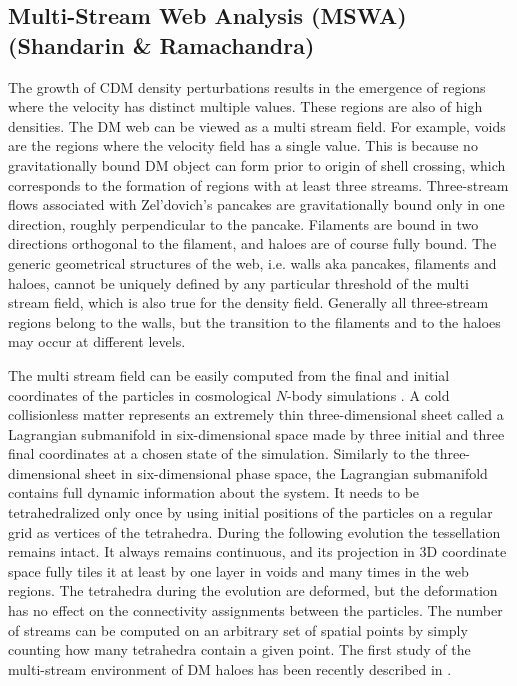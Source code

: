 \subsection{Multi-Stream Web Analysis (MSWA)\\ \hskip 0.85cm (Shandarin \& Ramachandra)}
\label{section:shandarin}

The growth of CDM density perturbations results in the emergence of regions where the velocity has distinct multiple values.
These regions are also of high densities. The DM web can be viewed as a multi stream field. For example, voids are the regions 
where the velocity field has a single value. This is because no gravitationally bound DM object can form prior to origin of shell crossing, which 
corresponds to the formation of regions with at least three streams. Three-stream flows associated with Zel'dovich's pancakes are
gravitationally bound only in one direction, roughly perpendicular to the pancake. Filaments are bound in two directions orthogonal to the
filament, and haloes are of course fully bound.
The generic geometrical structures of the web, i.e. walls aka pancakes, filaments and haloes, 
cannot be uniquely defined by any particular threshold of the multi stream field, which is also true for the density field.
Generally all three-stream regions belong to the walls, but the transition to the filaments and to the haloes may occur at different levels.

The multi stream field can be easily computed from the final and initial coordinates of the particles in cosmological $N$-body simulations
\citep{ abel2012,shandarin2012}. 
A cold collisionless matter represents an extremely thin three-dimensional sheet called a Lagrangian submanifold in six-dimensional space 
made by  three  initial and three final coordinates at a chosen state of the simulation. Similarly to the three-dimensional sheet in six-dimensional phase space, the
Lagrangian submanifold contains full dynamic information about the system. It needs to be tetrahedralized only once by using initial positions of the particles
on a regular grid as vertices of the tetrahedra. During the following evolution the tessellation remains intact. It always remains continuous, and
its projection in 3D coordinate space fully tiles it at least by one layer in voids and many times in the web regions.
The tetrahedra during the evolution are deformed, but the deformation has no effect on the connectivity assignments  between the particles.
The number of streams can be computed on an arbitrary set  of spatial points by simply counting how many tetrahedra contain a given point. 
The first study of the multi-stream environment of DM haloes has been recently described in \citet{Ramachandara_Shandarin:15}.


